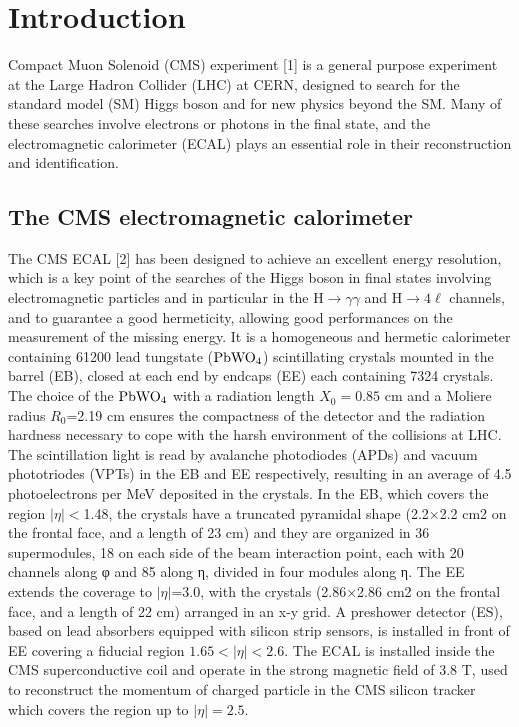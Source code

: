\documentclass[journal]{IEEEtran}
\begin{document}
%
\IEEEpeerreviewmaketitle



\section{Introduction}
 Compact Muon Solenoid (CMS) experiment [1] is a general purpose experiment at the Large Hadron Collider (LHC) at CERN, designed to search for the standard model (SM) Higgs boson and for new physics beyond the SM. Many of these searches involve electrons or photons in the final state, and the electromagnetic calorimeter (ECAL) plays an essential role in their reconstruction and identification.

\subsection{The CMS electromagnetic calorimeter}
The CMS ECAL [2] has been designed to achieve an excellent energy resolution, which is a key point of the searches of the Higgs boson in final states involving electromagnetic particles and in particular in the H$\to\gamma\gamma$ and H$\to4\ell$ channels, and to guarantee a good hermeticity, allowing good performances on the measurement of the missing energy.
It is a homogeneous and hermetic calorimeter containing 61200 lead tungstate ($\rm PbWO_4$) scintillating crystals mounted in the barrel (EB), closed at each end by endcaps (EE) each containing 7324 crystals. The choice of the $\rm PbWO_4$ with a radiation length $X_0=0.85$ cm and a Moliere radius $R_0$=2.19 cm ensures the compactness of the detector and the radiation hardness necessary to cope with the harsh environment of the collisions at LHC. The scintillation light is read by avalanche photodiodes (APDs) and vacuum phototriodes (VPTs) in the EB and EE
respectively, resulting in an average of 4.5 photoelectrons per MeV deposited in the crystals. In the EB, which covers the region $\vert\eta\vert<$1.48, the crystals have a truncated pyramidal shape (2.2×2.2 cm2 on the frontal face, and a length of 23 cm) and they are organized in 36 supermodules, 18 on each side of the beam interaction point, each with 20 channels along φ and 85 along η, divided in four modules along η. The EE extends the coverage to $\vert\eta\vert$=3.0, with the crystals (2.86×2.86 cm2 on the frontal face, and a length of 22 cm) arranged in an x-y grid. A preshower detector (ES), based on lead absorbers equipped with silicon strip sensors, is installed in front of EE covering a fiducial region $1.65<\vert\eta\vert<2.6$.
The ECAL is installed inside the CMS superconductive coil and operate in the strong magnetic field of 3.8 T, used to reconstruct the momentum of charged particle in the CMS silicon tracker which covers the region up to $\vert\eta\vert=2.5$.
\end{document}
